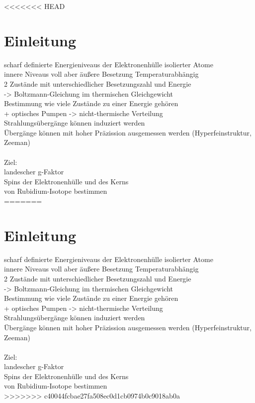 <<<<<<< HEAD
\section{Einleitung}

scharf definierte Energieniveaus der Elektronenhülle isolierter Atome\\
innere Niveaus voll aber äußere Besetzung Temperaturabhängig\\
2 Zustände mit unterschiedlicher Besetzungszahl und Energie\\
-> Boltzmann-Gleichung im thermischen Gleichgewicht\\
Bestimmung wie viele Zustände zu einer Energie gehören\\
+ optisches Pumpen -> nicht-thermische Verteilung\\
Strahlungsübergänge können induziert werden\\
Übergänge können mit hoher Präzission ausgemessen werden (Hyperfeinstruktur, Zeeman)\\
\\
Ziel:\\
landescher g-Faktor\\
Spins der Elektronenhülle und des Kerns\\
von Rubidium-Isotope bestimmen\\
=======
\section{Einleitung}

scharf definierte Energieniveaus der Elektronenhülle isolierter Atome\\
innere Niveaus voll aber äußere Besetzung Temperaturabhängig\\
2 Zustände mit unterschiedlicher Besetzungszahl und Energie\\
-> Boltzmann-Gleichung im thermischen Gleichgewicht\\
Bestimmung wie viele Zustände zu einer Energie gehören\\
+ optisches Pumpen -> nicht-thermische Verteilung\\
Strahlungsübergänge können induziert werden\\
Übergänge können mit hoher Präzission ausgemessen werden (Hyperfeinstruktur, Zeeman)\\
\\
Ziel:\\
landescher g-Faktor\\
Spins der Elektronenhülle und des Kerns\\
von Rubidium-Isotope bestimmen\\
>>>>>>> c40044fcbae27fa508ec0d1cb0974b0c9018ab0a
